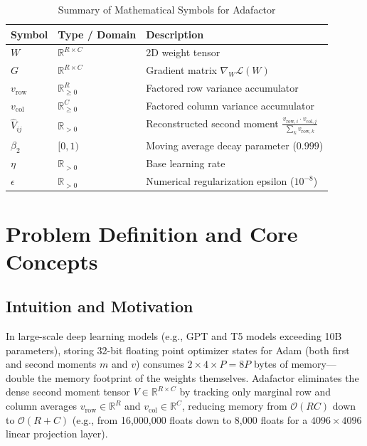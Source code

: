 \documentclass[11pt,a4paper]{article}
\theoremstyle{definition}
\begin{document}
\begin{table}[h]
\centering
\caption{Summary of Mathematical Symbols for Adafactor}
\begin{tabular}{lll}
\toprule
\textbf{Symbol} & \textbf{Type / Domain} & \textbf{Description} \\
\midrule
$W$ & $\mathbb{R}^{R \times C}$ & 2D weight tensor \\
$G$ & $\mathbb{R}^{R \times C}$ & Gradient matrix $\nabla_W \mathcal{L}(W)$ \\
$v_{\text{row}}$ & $\mathbb{R}^R_{\ge 0}$ & Factored row variance accumulator \\
$v_{\text{col}}$ & $\mathbb{R}^C_{\ge 0}$ & Factored column variance accumulator \\
$\hat{V}_{ij}$ & $\mathbb{R}_{> 0}$ & Reconstructed second moment $\frac{v_{\text{row}, i} \cdot v_{\text{col}, j}}{\sum_k v_{\text{row}, k}}$ \\
$\beta_2$ & $[0, 1)$ & Moving average decay parameter ($0.999$) \\
$\eta$ & $\mathbb{R}_{> 0}$ & Base learning rate \\
$\epsilon$ & $\mathbb{R}_{> 0}$ & Numerical regularization epsilon ($10^{-8}$) \\
\bottomrule
\end{tabular}
\end{table}

\section{Problem Definition and Core Concepts}

\subsection{Intuition and Motivation}
In large-scale deep learning models (e.g., GPT and T5 models exceeding 10B parameters), storing 32-bit floating point optimizer states for Adam (both first and second moments $m$ and $v$) consumes $2 \times 4 \times P = 8P$ bytes of memory—double the memory footprint of the weights themselves. Adafactor eliminates the dense second moment tensor $V \in \mathbb{R}^{R \times C}$ by tracking only marginal row and column averages $v_{\text{row}} \in \mathbb{R}^R$ and $v_{\text{col}} \in \mathbb{R}^C$, reducing memory from $\mathcal{O}(RC)$ down to $\mathcal{O}(R + C)$ (e.g., from 16,000,000 floats down to 8,000 floats for a $4096 \times 4096$ linear projection layer).
\end{document}
